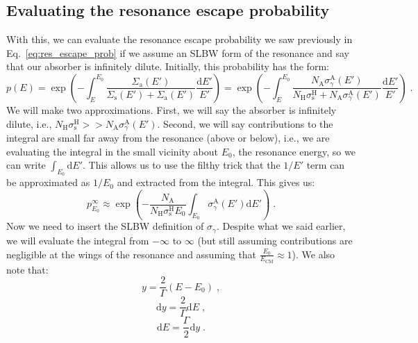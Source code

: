 \subsection{Evaluating the resonance escape probability}

With this, we can evaluate the resonance escape probability we saw previously in Eq.~\eqref{eq:res_escape_prob} if we assume an SLBW form of the resonance and say that our absorber is infinitely dilute. Initially, this probability has the form:
\begin{equation*}
    p(E) = \exp{\left(-\int^{E_0}_E\frac{\Sigma_\mathrm{a}(E')}{\Sigma_\mathrm{s}(E') + \Sigma_\mathrm{a}(E')}\frac{\mathrm{d}E'}{E'}\right)} = \exp{\left(-\int^{E_0}_E\frac{N_\mathrm{A}\sigma^{\mathrm{A}}_\gamma(E')}{N_\mathrm{H}\sigma^\mathrm{H}_\mathrm{s} + N_\mathrm{A}\sigma^{\mathrm{A}}_\gamma(E')}\frac{\mathrm{d}E'}{E'}\right)}\;\mathrm{.}
\end{equation*}
We will make two approximations. First, we will say the absorber is infinitely dilute, i.e., $N_\mathrm{H}\sigma^\mathrm{H}_\mathrm{s} >> N_\mathrm{A}\sigma^{\mathrm{A}}_\gamma(E')$. Second, we will say contributions to the integral are small far away from the resonance (above or below), i.e., we are evaluating the integral in the small vicinity about $E_0$, the resonance energy, so we can write $\int_{E_0}\mathrm{d}E'$. This allows us to use the filthy trick that the $1/E'$ term can be approximated as $1/E_0$ and extracted from the integral. This gives us:
\begin{equation*}
    p^\infty_{E_0} \approx \exp{\left(-\frac{N_\mathrm{A}}{N_\mathrm{H}\sigma^\mathrm{H}_\mathrm{s}E_0}\int_{E_0}\sigma^{\mathrm{A}}_\gamma(E')\mathrm{d}E'\right)}\;\mathrm{.}
\end{equation*}
Now we need to insert the SLBW definition of $\sigma_\gamma$. Despite what we said earlier, we will evaluate the integral from $-\infty$ to $\infty$ (but still assuming contributions are negligible at the wings of the resonance and assuming that $\frac{E_0}{E_\mathrm{CM}}\approx 1$). We also note that:
\begin{equation*}
    y = \frac{2}{\Gamma}(E - E_0)\;\mathrm{,}
\end{equation*}
\begin{equation*}
    \mathrm{d}y = \frac{2}{\Gamma}\mathrm{d}E\;\mathrm{,}
\end{equation*}
\begin{equation*}
    \mathrm{d}E = \frac{\Gamma}{2}\mathrm{d}y\;\mathrm{.}
\end{equation*}
